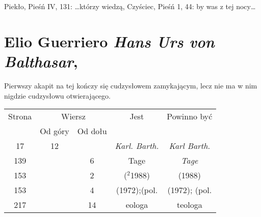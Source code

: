 \documentclass[a4paper,11pt]{article}
\numberwithin{equation}{section}
\begin{document}
\VerSpaceTwo


Piekło, Pieśń IV, 131: \ldots którzy wiedzą, Czyściec, Pieśń 1, 44: by was
z tej nocy\ldots












\section{Elio Guerriero \textit{Hans Urs von Balthasar},
  \cite{GuerrieroHansUrsVonBalthasarMonografia2004}}





\vspace{0em}


\noindent
{} Pierwszy akapit na tej kończy się cudzysłowem zamykającym, lecz
nie ma w nim nigdzie cudzysłowu otwierającego.

\VerSpaceFour







\begin{center}

  \begin{tabular}{|c|c|c|c|c|}
    \hline
    Strona & \multicolumn{2}{c|}{Wiersz} & Jest
                              & Powinno być \\ \cline{2-3}
    & Od góry & Od dołu & & \\
    \hline
    \hphantom{0}17 & 12 & & \textit{Karl. Barth.} & \textit{Karl Barth.} \\
    139 & & \hphantom{0}6 & Tage & \textit{Tage} \\
    153 & & \hphantom{0}2 & ($^{ 2 }$1988) & (1988) \\
    153 & & \hphantom{0}4 & (1972);(pol. & (1972); (pol. \\
    217 & & 14 & eologa & teologa \\
    \hline
  \end{tabular}

\end{center}
\end{document}
